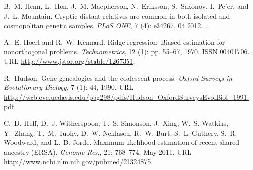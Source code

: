\documentclass{article}
\begin{document}
\begin{thebibliography}{76}
B.~M. Henn, L.~Hon, J.~M. Macpherson, N.~Eriksson, S.~Saxonov, I.~Pe'er, and
  J.~L. Mountain.
\newblock Cryptic distant relatives are common in both isolated and
  cosmopolitan genetic samples.
\newblock \emph{PLoS ONE}, 7 (4): e34267, 04
  2012{}.
\newblock {}.

A.~E. Hoerl and R.~W. Kennard.
\newblock Ridge regression: Biased estimation for nonorthogonal problems.
\newblock \emph{Technometrics}, 12 (1): pp. 55--67, 1970.
\newblock ISSN 00401706.
\newblock URL \url{http://www.jstor.org/stable/1267351}.

R.~Hudson.
\newblock Gene genealogies and the coalescent process.
\newblock \emph{Oxford Surveys in Evolutionary Biology}, 7
  (1): 44, 1990.
\newblock URL
  \url{http://web.eve.ucdavis.edu/pbg298/pdfs/Hudson_OxfordSurveysEvolBiol_1991.pdf}.

C.~D. Huff, D.~J. Witherspoon, T.~S. Simonson, J.~Xing, W.~S. Watkins,
  Y.~Zhang, T.~M. Tuohy, D.~W. Neklason, R.~W. Burt, S.~L. Guthery, S.~R.
  Woodward, and L.~B. Jorde.
\newblock Maximum-likelihood estimation of recent shared ancestry {(ERSA)}.
\newblock \emph{Genome Res.}, 21: 768--774, May 2011.
\newblock URL \url{http://www.ncbi.nlm.nih.gov/pubmed/21324875}.


\end{thebibliography}
\end{document}
